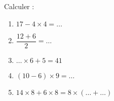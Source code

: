 
\begin{exercice}\label{exosmath-0814}


    Calculer :
    \begin{enumerate}
        \item
            \( 17-4\times 4=\ldots\)
        \item
            \( \dfrac{ 12+6 }{ 2 }=\ldots\)
        \item
            \( \ldots \times 6+5=41\)
        \item
            \( (10-6)\times 9=\ldots\)
        \item
            \( 14\times 8+6\times 8=  8\times (\ldots +\ldots)  \)
    \end{enumerate}


\end{exercice}
